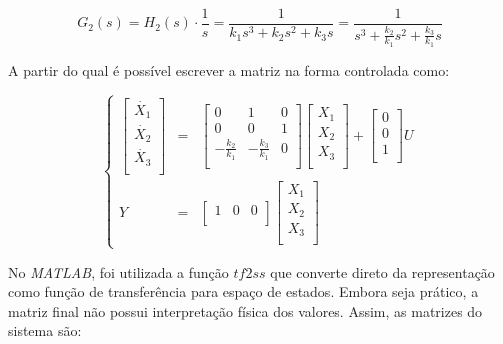 \documentclass[a4paper,11pt]{article}
\begin{document}
$$
G_2(s) = H_2(s)\cdot \frac{1}{s} = \frac{1}{k_1 s^3 + k_2 s^2 + k_3 s} = \frac{1}{s^3 + \frac{k_2}{k_1} s^2 + \frac{k_3}{k_1} s}
$$

A partir do qual é possível escrever a matriz na forma controlada como:

\begin{equation}
\left\{
\begin{array}{rcl}
\left[\begin{array}{c}
    \dot{X_1} \\
    \dot{X_2} \\
    \dot{X_3} \\
\end{array}
\right]
&
=
&
\left[
\begin{array}{ccc}
    0 & 1 & 0 \\
    0 & 0 & 1 \\
    -\frac{k_2}{k_1} & -\frac{k_3}{k_1} & 0 \\ 
\end{array}
\right]
\left[\begin{array}{c}
    X_1 \\
    X_2 \\
    X_3 \\
\end{array}
\right]
+
\left[\begin{array}{c}
    0 \\
    0 \\
    1 \\
\end{array}
\right]
U\\
Y & = &\left[
\begin{array}{ccc}
    1 & 0 & 0 \\
\end{array}
\right]
\left[\begin{array}{c}
    X_1 \\
    X_2 \\
    X_3 \\
\end{array}
\right]
\end{array}
\right.
\end{equation}

No \textit{MATLAB}, foi utilizada a função \textit{$tf2ss$} que converte direto da representação como função de transferência para espaço de estados. Embora seja prático, a matriz final não possui interpretação física dos valores. Assim, as matrizes do sistema são:
\end{document}
